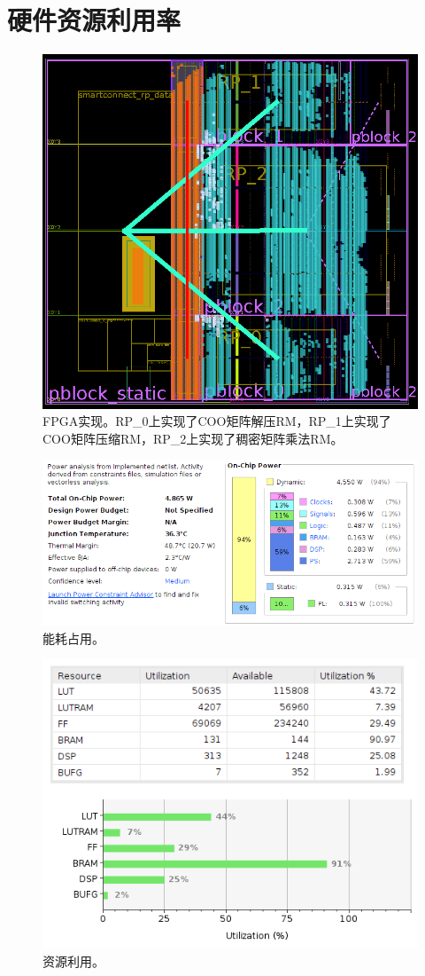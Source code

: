 \section{硬件资源利用率}

\begin{figure}[htbp]
\centerline{\includegraphics[width=0.8\columnwidth]{figures/a.png}}
\caption{FPGA实现。RP\_0上实现了COO矩阵解压RM，RP\_1上实现了COO矩阵压缩RM，RP\_2上实现了稠密矩阵乘法RM。}
\label{fig:a}
\end{figure}

\begin{figure}[htbp]
\centerline{\includegraphics[width=0.8\columnwidth]{figures/b.png}}
\caption{能耗占用。}
\label{fig:b}
\end{figure}

\begin{figure}[htbp]
\centerline{\includegraphics[width=0.8\columnwidth]{figures/c.png}}
\caption{资源利用。}
\label{fig:c}
\end{figure}

